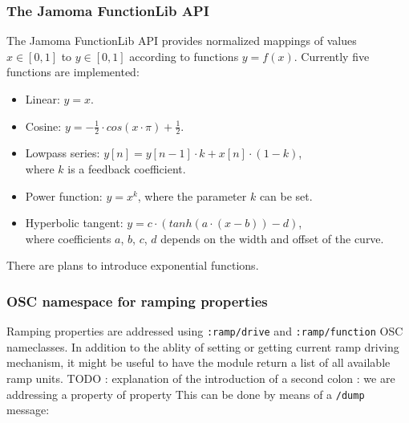 \documentclass{NIME-alternate}
\begin{document}


\subsubsection{The Jamoma FunctionLib API} %
\label{ssub:the_function_lib}

The Jamoma FunctionLib API provides normalized mappings of values $x \in [0,1]$ to $y \in [0,1]$ according to functions $y = f(x)$. Currently five functions are implemented: 

\begin{itemize}

	\item Linear: $y = x$.

	\item Cosine: $y = - \frac{1}{2} \cdot cos(x \cdot \pi ) + \frac{1}{2} $.

	\item Lowpass series: $y[n] = y[n-1] \cdot k + x[n] \cdot (1-k)$, \\ where $k$ is a feedback coefficient.

	\item Power function: $ y = x^{k} $, where the parameter $k$ can be set.

	\item Hyperbolic tangent: $ y = c \cdot (tanh(a\cdot(x-b)) - d) $, \\ where coefficients $a$, $b$, $c$, $d$ depends on the width and offset of the curve.
	
\end{itemize}

There are plans to introduce exponential functions.




\subsubsection{OSC namespace for ramping properties} %
\label{ssub:osc_namespace_for_ramping_properties}

Ramping properties are addressed using \texttt{:ramp/drive} and \texttt{:ramp/function} OSC nameclasses. In addition to the ablity of setting or getting current ramp driving mechanism, it might be useful to have the module return a list of all available ramp units. 
TODO : explanation of the introduction of a second colon : we are addressing a property of property 
This can be done by means of a \texttt{/dump} message:
\end{document}
